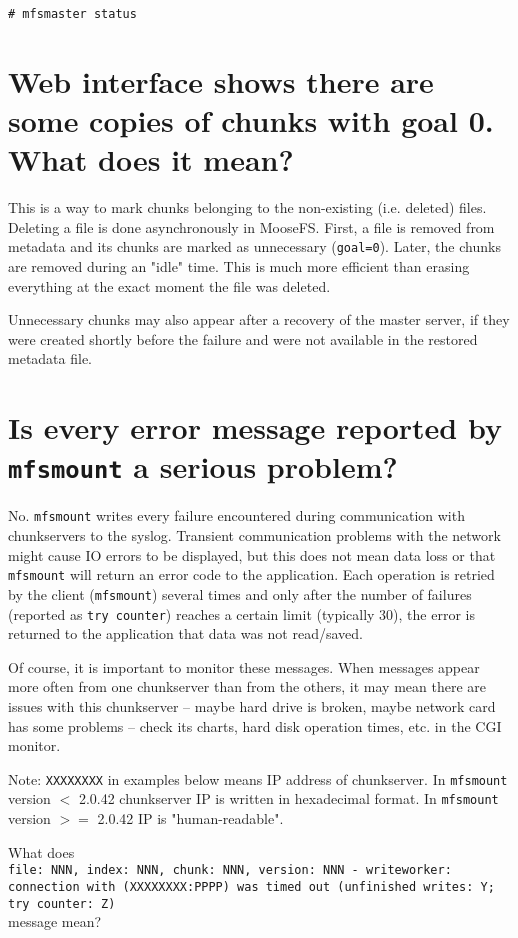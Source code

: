 \documentclass[a4paper,11pt,english]{report}
\def\code#1{\texttt{#1}}
\begin{document}
		\code{\# mfsmaster status}

		\section{Web interface shows there are some copies of chunks with goal 0. What does it mean?}
		This is a way to mark chunks belonging to the non-existing (i.e. deleted) files. Deleting a file is done asynchronously in MooseFS. First, a file is removed from metadata and its chunks are marked as unnecessary (\code{goal=0}). Later, the chunks are removed during an "idle" time. This is much more efficient than erasing everything at the exact moment the file was deleted.
		
		Unnecessary chunks may also appear after a recovery of the master server, if they were created shortly before the failure and were not available in the restored metadata file.

		 
		\section{Is every error message reported by \code{mfsmount} a serious problem?}
		No. \code{mfsmount} writes every failure encountered during communication with chunkservers to the syslog. Transient communication problems with the network might cause IO errors to be displayed, but this does not mean data loss or that \code{mfsmount} will return an error code to the application. Each operation is retried by the client (\code{mfsmount}) several times and only after the number of failures (reported as \code{try counter}) reaches a certain limit (typically 30), the error is returned to the application that data was not read/saved.
		
		Of course, it is important to monitor these messages. When messages appear more often from one chunkserver than from the others, it may mean there are issues with this chunkserver -- maybe hard drive is broken, maybe network card has some problems -- check its charts, hard disk operation times, etc. in the CGI monitor.
		
		Note: \code{XXXXXXXX} in examples below means IP address of chunkserver. In \code{mfsmount} version $<$ 2.0.42 chunkserver IP is written in hexadecimal format. In \code{mfsmount} version $>=$ 2.0.42 IP is "human-readable".
		 
		What does \\
		\code{file: NNN, index: NNN, chunk: NNN, version: NNN - writeworker:
		connection with (XXXXXXXX:PPPP) was timed out (unfinished writes: Y; try counter: Z)} \\
		message mean?
		
\end{document}

